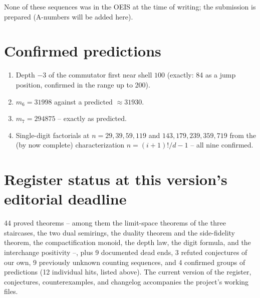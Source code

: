 None of these sequences was in the OEIS at the time of writing;
the submission is prepared (A-numbers will be added here).

\section*{Confirmed predictions}

\begin{enumerate}
\item Depth $-3$ of the commutator first near shell $100$
      (exactly: 84 as a jump position, confirmed in the range up
      to 200).
\item $m_6=31998$ against a predicted $\approx31930$.
\item $m_7=294875$ -- exactly as predicted.
\item Single-digit factorials at $n=29,39,59,119$ and
      $143,179,239,359,719$ from the (by now complete)
      characterization $n=(i{+}1)!/d-1$ -- all nine confirmed.
\end{enumerate}

\section*{Register status at this version's editorial deadline}

44 proved theorems -- among them the limit-space theorems of the
three staircases, the two dual semirings, the duality theorem and
the side-fidelity theorem, the compactification monoid, the depth
law, the digit formula, and the interchange positivity --, plus
9 documented dead ends, 3 refuted conjectures of our own,
9 previously unknown counting sequences, and 4 confirmed groups of
predictions (12 individual hits, listed above). The current
version of the register, conjectures, counterexamples, and
changelog accompanies the project's working files.

